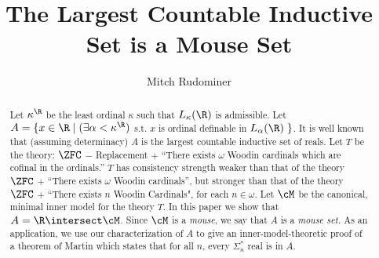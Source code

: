 \documentclass[oneside,12pt]{amsart}
\begin{document}
\title{The Largest Countable Inductive Set is a Mouse Set}

\author{Mitch Rudominer}

\address{Department of Mathematics\\
         Florida International University\\
         Miami, FL 33199}



\begin{abstract}
 Let $\kappa^{\R}$ be the least ordinal $\kappa$ such that
$L_{\kappa}(\R)$ is admissible. Let $A = \{x\in\R\;|\;
(\exists\alpha<\kappa^{\R})$ s.t. $x$ is
ordinal definable in $L_{\alpha}(\R)\;\}$. It is well known
that (assuming determinacy) $A$ is the largest countable inductive set
of reals.  Let $T$ be the theory:
$\ZFC$ $-$ Replacement $+$ ``There exists $\omega$ Woodin cardinals which
are cofinal in the ordinals.''  $T$ has consistency strength weaker than
that of
the theory $\ZFC$ $+$ ``There exists $\omega$ Woodin cardinals'', but
stronger than that of
the theory $\ZFC$ $+$ ``There exists $n$ Woodin Cardinals",
for each $n\in\omega$. Let $\cM$ be the canonical, minimal
inner model for the theory  $T$.
In this paper we show that $A=\R\intersect\cM$. Since $\cM$ is
a \emph{mouse}, we say that $A$ is a \emph{mouse set.}
As an application,
we use our characterization of $A$ to give an inner-model-theoretic proof
of a theorem of Martin which states that for all  $n$, every
$\Sigma^*_n$ real is in $A$.
\end{abstract}

\maketitle

\tableofcontents

\setcounter{section}{-1}












\end{document}
